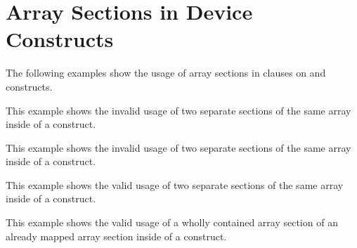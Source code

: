 \pagebreak
\section{Array Sections in Device Constructs}
\label{sec:array_sections}

The following examples show the usage of array sections in  clauses 
on  and   constructs.

This example shows the invalid usage of two separate sections of the same array 
inside of a  construct.



\pagebreak
This example shows the invalid usage of two separate sections of the same array 
inside of a  construct.



\pagebreak
This example shows the valid usage of two separate sections of the same array inside 
of a  construct.



\pagebreak
This example shows the valid usage of a wholly contained array section of an already 
mapped array section inside of a  construct.



